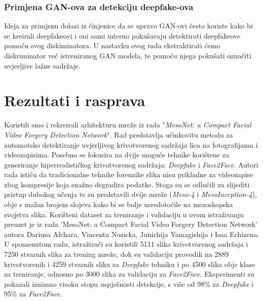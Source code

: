 \documentclass[seminarski, times, utf8]{fer}
\begin{document}
\subsection {Primjena GAN-ova za detekciju deepfake-ova}
Ideja za primjenu dolazi iz činjenice da se upravo GAN-ovi često koriste kako bi se kreirali deepfakeovi i oni sami interno pokušavaju detektirati deepfakeove pomoću svog diskiminatora. 
U nastavku ovog rada ekstraktirati ćemo diskriminator već istreniranog GAN modela, te pomoću njega pokušati označiti uvjerljive lažne sadržaje. 

\chapter{Rezultati i rasprava}
\label{pog:rezultati_i_rasprava}
Koristili smo i rekreirali arhitekturu mreže iz rada "\textit{MesoNet: a Compact Facial Video Forgery Detection Network}\cite{mesonet}". Rad predstavlja učinkovitu metodu za automatsko detektiranje uvjerljivog krivotvorenog sadržaja lica na fotografijama i videozapisima. Posebno se fokusira na dvije moguće tehnike korištene za generiranje hiperrealističkog krivotvorenog sadržaja: \textit{Deepfake} i \textit{Face2Face}. Autori rada ističu da tradicionalne tehnike forenzike slika nisu prikladne za videozapise zbog kompresije koja snažno degradira podatke. Stoga su se odlučili za slijediti pristup dubokog učenja te su predstavili dvije mreže (\textit{Meso-4} i \textit{MesoInception-4}), obje s malim brojem slojeva kako bi se bolje usredotočile na mezoskopska svojstva slika. Korišteni dataset za treniranje i validaciju u ovom istraživanju preuzet je iz rada 'MesoNet: a Compact Facial Video Forgery Detection Network' autora Dariusa Afchara, Vincenta Nozicka, Junichija Yamagishija i Isaa Echizena. U spomenutom radu, istraživači su koristili 5111 slika krivotvorenog sadržaja i 7250 stvarnih slika za trening mreže, dok su validaciju provodili na 2889 krivotvorenih i 4259 stvarnih slika za \textit{Deepfake} tehniku i po 4500 slika obje klase za treniranje, odnosno po 3000 slika za validaciju za \textit{Face2Face}.
Eksperimenti su pokazali iznimno visoku stopu uspješnosti detekcije, s više od 98\% za \textit{Deepfake} i 95\% za \textit{Face2Face}.
\end{document}
